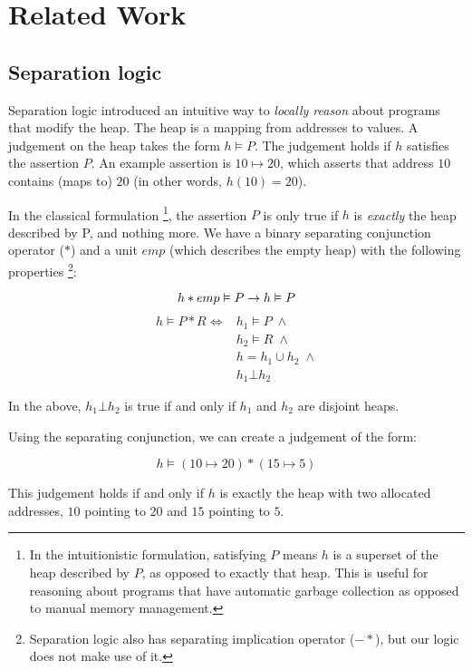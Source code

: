 \section{Related Work}

\subsection{Separation logic}
Separation logic\cite{reynolds2002separation} introduced an intuitive way to
\textit{locally reason} about programs that modify the heap.
The heap is a
mapping from addresses to values.
A judgement on the heap takes the form
$h \vDash P$.
The judgement holds if $h$ satisfies the assertion $P$.
An
example assertion is $10 \mapsto 20$, which asserts that address $10$ contains
(maps to) $20$ (in other words, $h(10) = 20$).

In the classical formulation
\footnote{In the intuitionistic formulation,
satisfying $P$ means $h$ is a superset of the heap described by $P$, as opposed
to exactly that heap.
This is useful for reasoning about programs that have
automatic garbage collection as opposed to manual memory management.},
the
assertion $P$ is only true if $h$ is \textit{exactly} the heap described by P,
and nothing more.
We have a binary separating conjunction operator ($\ast$) and
a unit $emp$ (which describes the empty heap) with the following
properties
\footnote{Separation logic also has separating implication operator
($-\!\!\ast$), but our logic does not make use of it.}:

\[
    h \ast emp \vDash P \rightarrow h \vDash P \\
\]
\begin{align*}
    h \vDash P \ast R \iff &h_1 \vDash P \; \wedge \\
		           &h_2 \vDash R \; \wedge \\
		           &h = h_1 \cup h_2 \; \wedge \\
			   &h_1 \bot h_2
\end{align*}

In the above, $h_1 \bot h_2$ is true if and only if $h_1$ and $h_2$ are disjoint heaps.


Using the separating conjunction, we can create a judgement of the form:

\[ h \vDash (10\mapsto20) * (15\mapsto5) \]

This judgement holds if and only if $h$ is exactly the heap with two allocated
addresses, $10$ pointing to $20$ and $15$ pointing to $5$.

